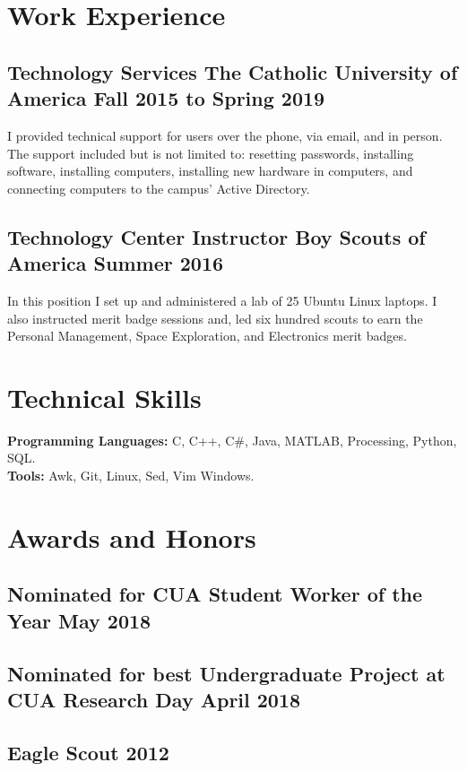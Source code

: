 \documentclass[12pt]{article}
\begin{document}
\section{Work Experience}
\subsection{Technology Services \hspace {60pt}The Catholic University of America \hfill Fall 2015 to Spring 2019}
\justify
I provided technical support for users over the phone, via email, and in person.
The support included but is not limited to:
resetting passwords,
installing software,
installing computers,
installing new hardware in computers,
and
connecting computers to the campus' Active Directory.
\subsection{Technology Center Instructor \hspace {45pt} Boy Scouts of America \hfill Summer 2016}
\justify
In this position I set up and administered a lab of 25 Ubuntu Linux laptops.
I also instructed merit badge sessions and, led six hundred scouts to earn the
Personal Management,
Space Exploration,
and
Electronics
merit badges.

\section{Technical Skills}
\textbf{Programming Languages:}
C,
C++,
C\#,
Java,
MATLAB,
Processing,
Python,
SQL.\\
\textbf{Tools:}
Awk,
Git,
Linux,
Sed,
Vim
Windows.

\section{Awards and Honors}
\subsection{Nominated for CUA Student Worker of the Year \hfill May 2018}
\subsection{Nominated for best Undergraduate Project at CUA Research Day \hfill April 2018}
\subsection{Eagle Scout \hfill 2012}
\end{document}
